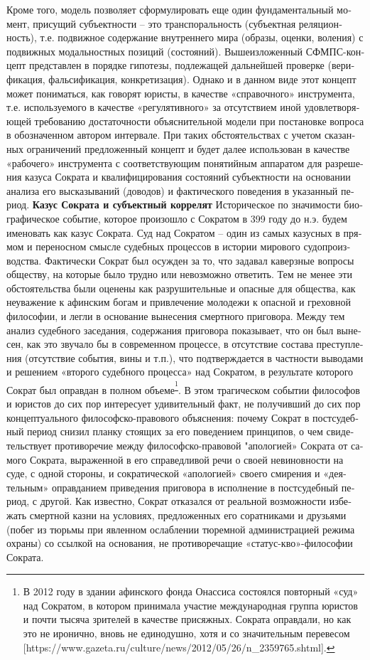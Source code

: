 \begin{russian}
    Кроме того, модель позволяет сформулировать еще один фундаментальный момент, присущий субъектности – это транспоральность (субъектная реляционность), т.е. подвижное содержание внутреннего мира (образы, оценки, воления) с подвижных модальностных позиций (состояний).  
    Вышеизложенный СФМПС-концепт представлен в порядке гипотезы, подлежащей дальнейшей проверке (верификация, фальсификация, конкретизация).  Однако и в данном виде этот концепт может пониматься, как говорят юристы, в качестве «справочного» инструмента, т.е. используемого в качестве «регулятивного» за отсутствием иной удовлетворяющей требованию достаточности объяснительной модели при постановке вопроса в обозначенном автором интервале. При таких обстоятельствах с учетом сказанных ограничений предложенный концепт и будет далее использован в качестве «рабочего» инструмента с соответствующим понятийным аппаратом для разрешения казуса Сократа и квалифицирования состояний субъектности на основании анализа его высказываний (доводов) и фактического поведения в указанный период.
    \textbf{Казус Сократа и субъектный коррелят}
    Историческое по значимости биографическое событие, которое произошло с Сократом в 399 году до н.э. будем именовать как казус Сократа. 
    Суд над Сократом – один из самых казусных в прямом и переносном смысле судебных процессов в истории мирового судопроизводства. Фактически Сократ был осужден за то, что задавал каверзные вопросы обществу, на которые было трудно или невозможно ответить. Тем не менее эти обстоятельства были оценены как разрушительные и опасные для общества, как неуважение к афинским богам и привлечение молодежи к опасной и греховной философии, и легли в основание вынесения смертного приговора.
    Между тем анализ судебного заседания, содержания приговора показывает, что он был вынесен, как это  звучало бы в современном процессе, в отсутствие состава преступления (отсутствие события, вины и т.п.),  что подтверждается в частности выводами и решением «второго судебного процесса» над Сократом, в результате которого Сократ был оправдан в полном объеме\textsuperscript{\footnote{В 2012 году в здании афинского фонда Онассиса состоялся повторный «суд» над Сократом, в котором принимала участие международная группа юристов и почти тысяча зрителей в качестве присяжных. Сократа оправдали, но как это не иронично, вновь не единодушно, хотя и со значительным перевесом [https://www.gazeta.ru/culture/news/2012/05/26/n_2359765.shtml].}}.
    В этом трагическом событии философов и юристов до сих пор интересует удивительный факт, не получивший до сих пор концептуального философско-правового объяснения: почему Сократ в постсудебный период снизил планку стоящих за его поведением принципов, о чем свидетельствует противоречие между философско-правовой "апологией» Сократа от самого Сократа, выраженной в его справедливой речи о своей невиновности на суде, с одной стороны, и сократической «апологией» своего смирения и «деятельным» оправданием приведения приговора в исполнение в постсудебный период, с другой. Как известно, Сократ отказался от реальной возможности избежать смертной казни на условиях, предложенных его соратниками и друзьями (побег из тюрьмы при явленном ослаблении тюремной администрацией режима охраны) со ссылкой на основания, не противоречащие  «статус-кво»-философии Сократа. 

\end{russian}
